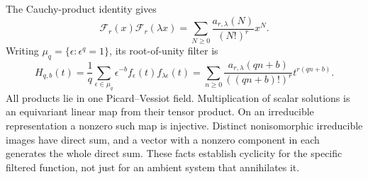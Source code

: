 \documentclass[11pt,a4paper]{article}
\theoremstyle{definition}
\theoremstyle{remark}
\numberwithin{equation}{section}
\begin{document}
The Cauchy-product identity gives
\[
 \mathcal F_r(x)\mathcal F_r(\lambda x)
 =\sum_{N\ge0}\frac{a_{r,\lambda}(N)}{(N!)^r}x^N.
\]
Writing $\mu_q=\{\epsilon:\epsilon^q=1\}$, its root-of-unity
filter is
\begin{equation}\label{p8:ac:filter}
 H_{q,b}(t)=\frac1q\sum_{\epsilon\in\mu_q}
                 \epsilon^{-b} f_\epsilon(t)f_{\lambda\epsilon}(t)
 =\sum_{n\ge0}\frac{a_{r,\lambda}(qn+b)}{((qn+b)!)^r}
                   t^{r(qn+b)}.
\end{equation}
All products lie in one Picard--Vessiot field. Multiplication of scalar
solutions is an equivariant linear map from their tensor product.
On an irreducible representation a nonzero such map is injective.
Distinct nonisomorphic irreducible images have direct sum, and a vector
with a nonzero component in each generates the whole direct sum.
These facts establish cyclicity for the specific filtered function,
not just for an ambient system that annihilates it.
\end{document}
